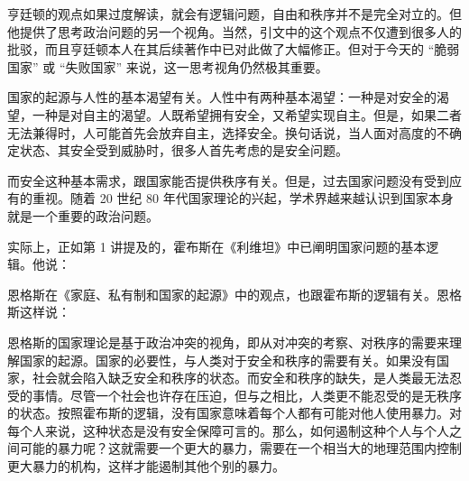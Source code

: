 亨廷顿的观点如果过度解读，就会有逻辑问题，自由和秩序并不是完全对立的。但他提供了思考政治问题的另一个视角。当然，引文中的这个观点不仅遭到很多人的批驳，而且亨廷顿本人在其后续著作中已对此做了大幅修正。但对于今天的 “脆弱国家” 或 “失败国家” 来说，这一思考视角仍然极其重要。


国家的起源与人性的基本渴望有关。人性中有两种基本渴望：一种是对安全的渴望，一种是对自主的渴望。人既希望拥有安全，又希望实现自主。但是，如果二者无法兼得时，人可能首先会放弃自主，选择安全。换句话说，当人面对高度的不确定状态、其安全受到威胁时，很多人首先考虑的是安全问题。

而安全这种基本需求，跟国家能否提供秩序有关。但是，过去国家问题没有受到应有的重视。随着 20 世纪 80 年代国家理论的兴起，学术界越来越认识到国家本身就是一个重要的政治问题。

实际上，正如第 1 讲提及的，霍布斯在《利维坦》中已阐明国家问题的基本逻辑。他说：


恩格斯在《家庭、私有制和国家的起源》中的观点，也跟霍布斯的逻辑有关。恩格斯这样说：


恩格斯的国家理论是基于政治冲突的视角，即从对冲突的考察、对秩序的需要来理解国家的起源。国家的必要性，与人类对于安全和秩序的需要有关。如果没有国家，社会就会陷入缺乏安全和秩序的状态。而安全和秩序的缺失，是人类最无法忍受的事情。尽管一个社会也许存在压迫，但与之相比，人类更不能忍受的是无秩序的状态。按照霍布斯的逻辑，没有国家意味着每个人都有可能对他人使用暴力。对每个人来说，这种状态是没有安全保障可言的。那么，如何遏制这种个人与个人之间可能的暴力呢？这就需要一个更大的暴力，需要在一个相当大的地理范围内控制更大暴力的机构，这样才能遏制其他个别的暴力。

